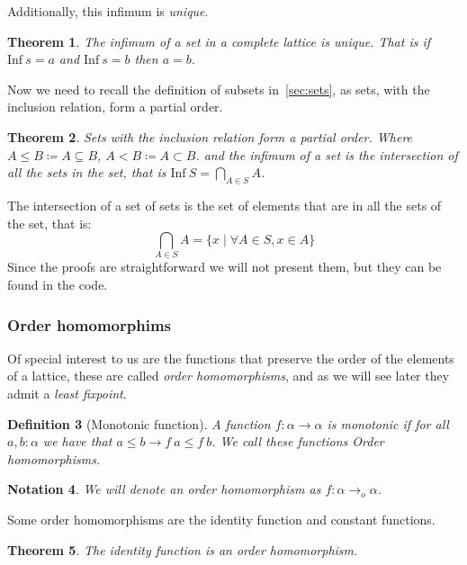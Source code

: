 \documentclass[
  a4paper, 
  10pt, 
  parskip=half, 
  DIV=20,
  toc=bibliography,
  usegeometry,
]{scrartcl}
\newtheorem{theorem}{Theorem}[section]
\newtheorem{definition}[theorem]{Definition}
\newtheorem{notation}[theorem]{Notation}
\newcommand{\funfont}[1]{\text{#1}}
\renewcommand{\implies}{\rightarrow}
\begin{document}
Additionally, this infimum is \emph{unique}.

\begin{theorem}
  The infimum of a set in a complete lattice is unique.
  That is if \(\funfont{Inf} \ s = a\) and \(\funfont{Inf} \ s = b\) then \(a = b\).
\end{theorem}

Now we need to recall the definition of subsets in~\ref{sec:sets},
as sets, with the inclusion relation, form a partial order.

\begin{theorem}
  Sets with the inclusion relation form a partial order. Where
  \(A \leq B \coloneqq A \subseteq B\), \(A < B \coloneqq A \subset B\).
  and the infimum of a set is the intersection of all the sets in the set,
  that is \(\funfont{Inf} \ S = \bigcap_{A \in S} A\).
\end{theorem}

The intersection of a set of sets is the set of elements that are in all the sets
of the set, that is:
\[
  \bigcap_{A \in S} A = \{x \mid \forall A \in S, x \in A\}
\]
Since the proofs are
straightforward we will not present them, but they can be found in the code.

\subsubsection{Order homomorphims}

Of special interest to us are the functions that preserve the order of the elements
of a lattice, these are called \emph{order homomorphisms}, and as we will see
later they admit a \emph{least fixpoint}.

\begin{definition}[Monotonic function]
  A function \(f: \alpha \to \alpha\) is monotonic if for all \(a, b: \alpha\)
  we have that \(a \leq b \implies f \ a \leq f \ b\). We call these functions
  \emph{Order homomorphisms}.
\end{definition}

\begin{notation}
  We will denote an order homomorphism as \(f: \alpha \to_o \alpha\).
\end{notation}

Some order homomorphisms are the identity function and constant functions.

\begin{theorem}
  The identity function is an order homomorphism.
\end{theorem}
\end{document}
